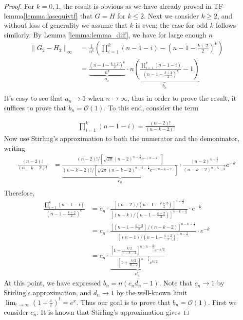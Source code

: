 \documentclass[a4paper]{article}
\renewcommand{\cal}{\mathcal}
\begin{document}
\begin{proof}
For $k = 0, 1$, the result is obvious as we have already proved in TF-lemma\ref{lemma:lasequivtf} that $G = H$ for $k\leq 2$. Next we consider $k\geq 2$, and without loss of generality we assume that $k$ is even; the case for odd $k$ follows similarly. By Lemma \ref{lemma:lemma_diff}, we have for large enough $n$
\begin{align*}
\|G_2-H_2\|_\infty &= \frac{1}{n^k}(\prod_{i=1}^k(n-1-i) - (n-1-\frac{k+2}{2})^k)\\
&= \underbrace{\frac{(n-1-\frac{k+2}{2})^k}{n^k}}_\text{$a_n$} \cdot \underbrace{n(\frac{\prod_{i=1}^k(n-1-i)}{(n-1-\frac{k+2}{2})^k} - 1)}_\text{$b_n$}\\
\end{align*}
It's easy to see that $a_n\rightarrow 1$ when $n\rightarrow \infty$, thus in order to prove the result, it suffices to prove that $b_n = \cal{O}(1)$. To this end, consider the term

\begin{align*}
\prod_{i=1}^k (n-1-i) = \frac{(n-2)!}{(n-k-2)!}
\end{align*}
Now use Stirling's approximation to both the numerator and the demoninator, writing
\begin{align*}
\frac{(n-2)!}{(n-k-2)!} &= \underbrace{\frac{(n-2)!/[\sqrt{2\pi}(n-2)^{n-\frac{3}{2}}e^{-(n-2)}]}{(n-k-2)!/[\sqrt{2\pi}(n-k-2)^{n-k-\frac{3}{2}}e^{-(n-k-2)}]}}_\text{$c_n$}\cdot\frac{(n-2)^{n-\frac{3}{2}}}{(n-k-2)^{n-k-\frac{3}{2}}}e^{-k}\\
\end{align*}
Therefore,
\begin{align*}
\frac{\prod_{i=1}^k(n-1-i)}{(n-1-\frac{k+2}{2})^k} &= c_n \cdot \frac{[(n-2)/(n-1-\frac{k+2}{2})]^{n-\frac{3}{2}}}{[(n-k)/(n-1-\frac{k+2}{2})]^{n-k-\frac{3}{2}}}\cdot e^{-k}\\
&= c_n \cdot \frac{[(n-1-\frac{k+2}{2})/(n-k-2)]^{n-k-\frac{3}{2}}}{[(n-1)/(n-1-\frac{k+2}{2})]^{n-\frac{3}{2}}}\cdot e^{-k}\\
&= c_n \cdot \underbrace{\frac{[1+\frac{k/2}{n-k-2}]^{n-k-\frac{3}{2}}e^{-k/2}}{[1+\frac{k/2}{n-2}]^{n-\frac{3}{2}}e^{k/2}}}_\text{$d_n$}
\end{align*}
At this point, we have expressed $b_n = n(c_nd_n -1)$. Note that $c_n\rightarrow 1$ by Stirling's approximation, and $d_n\rightarrow 1$ by the well-known limit $\lim_{t\rightarrow \infty}(1+\frac{x}{t})^t = e^x$. Thus our goal is to prove that $b_n = \cal{O}(1)$. First we consider $c_n$. It is known that Stirling's approximation \cite{nemes2010coefficients} gives


\end{proof}
\end{document}

